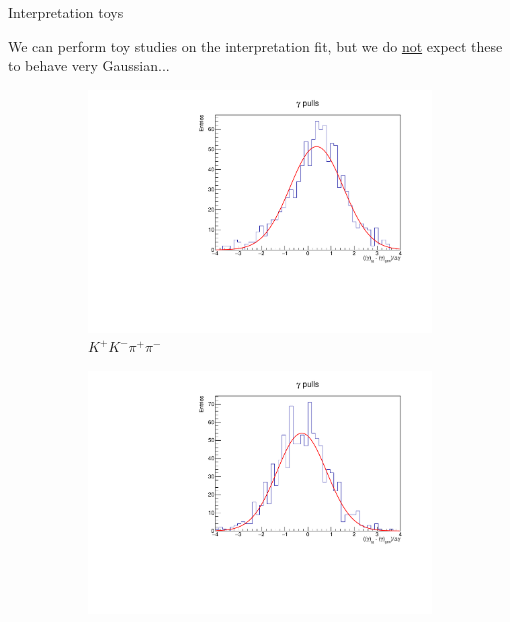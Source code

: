 \documentclass[xcolor={dvipsnames}]{beamer}
\begin{document}
\begin{frame}{Interpretation toys}
  \begin{center}
    We can perform toy studies on the interpretation fit, but we do \underline{not} expect these to behave very Gaussian...
  \end{center}
  \begin{figure}
    \centering
    \begin{subfigure}{0.5\textwidth}
      \centering
      \includegraphics[width=1.0\textwidth]{Plots/gamma_pull_toys_KKpipi.pdf}
      \vspace{-0.3cm}
      \caption*{$K^+K^-\pi^+\pi^-$}
    \end{subfigure}%
    \begin{subfigure}{0.5\textwidth}
      \centering
      \includegraphics[width=1.0\textwidth]{Plots/gamma_pull_toys_pipipipi.pdf}

\end{subfigure}
\end{figure}
\end{frame}
\end{document}
